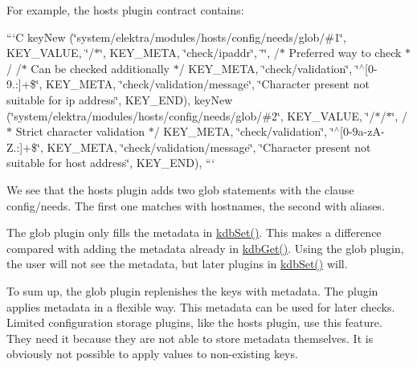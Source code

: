 For example, the hosts plugin contract contains\+:

```\+C key\+New (\char`\"{}system/elektra/modules/hosts/config/needs/glob/\#1\char`\"{}, K\+E\+Y\+\_\+\+V\+A\+L\+U\+E, \char`\"{}/$\ast$\char`\"{}, K\+E\+Y\+\_\+\+M\+E\+T\+A, \char`\"{}check/ipaddr\char`\"{}, \char`\"{}\char`\"{}, /$\ast$ Preferred way to check $\ast$/ /$\ast$ Can be checked additionally $\ast$/ K\+E\+Y\+\_\+\+M\+E\+T\+A, \char`\"{}check/validation\char`\"{}, \char`\"{}$^\wedge$\mbox{[}0-\/9.\+:\mbox{]}+\$\char`\"{}, K\+E\+Y\+\_\+\+M\+E\+T\+A, \char`\"{}check/validation/message\char`\"{}, \char`\"{}\+Character present not suitable for ip address\char`\"{}, K\+E\+Y\+\_\+\+E\+N\+D), key\+New (\char`\"{}system/elektra/modules/hosts/config/needs/glob/\#2\char`\"{}, K\+E\+Y\+\_\+\+V\+A\+L\+U\+E, \char`\"{}/$\ast$/$\ast$\char`\"{}, /$\ast$ Strict character validation $\ast$/ K\+E\+Y\+\_\+\+M\+E\+T\+A, \char`\"{}check/validation\char`\"{}, \char`\"{}$^\wedge$\mbox{[}0-\/9a-\/z\+A-\/\+Z.\+:\mbox{]}+\$\char`\"{}, K\+E\+Y\+\_\+\+M\+E\+T\+A, \char`\"{}check/validation/message\char`\"{}, \char`\"{}\+Character present not suitable for host address\char`\"{}, K\+E\+Y\+\_\+\+E\+N\+D), ```

We see that the {\ttfamily hosts} plugin adds two glob statements with the clause {\ttfamily config/needs}. The first one matches with hostnames, the second with aliases.

The glob plugin only fills the metadata in {\ttfamily \hyperlink{group__kdb_ga11436b058408f83d303ca5e996832bcf}{kdb\+Set()}}. This makes a difference compared with adding the metadata already in {\ttfamily \hyperlink{group__kdb_ga28e385fd9cb7ccfe0b2f1ed2f62453a1}{kdb\+Get()}}. Using the glob plugin, the user will not see the metadata, but later plugins in {\ttfamily \hyperlink{group__kdb_ga11436b058408f83d303ca5e996832bcf}{kdb\+Set()}} will.

To sum up, the glob plugin replenishes the keys with metadata. The plugin applies metadata in a flexible way. This metadata can be used for later checks. Limited configuration storage plugins, like the {\ttfamily hosts} plugin, use this feature. They need it because they are not able to store metadata themselves. It is obviously not possible to apply values to non-\/existing keys. 